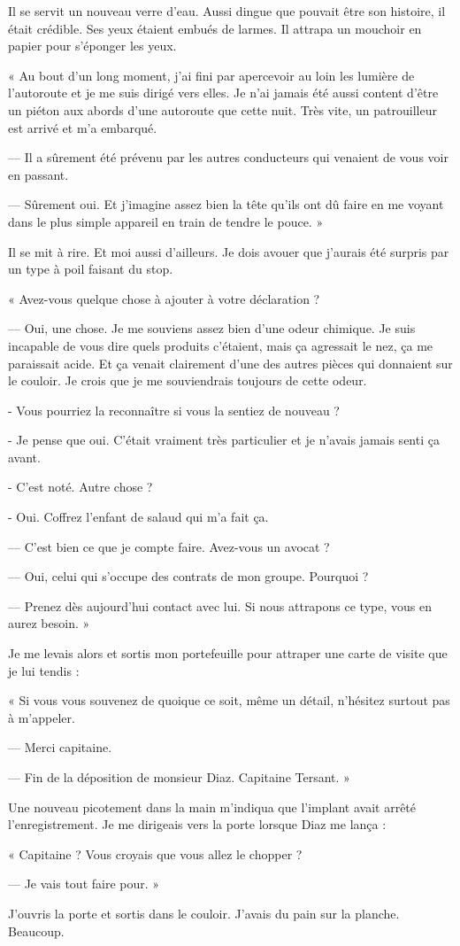 Il se servit un nouveau verre d'eau. Aussi dingue que pouvait être son histoire, il était crédible. Ses yeux étaient
embués de larmes. Il attrapa un mouchoir en papier pour s'éponger les yeux.

« Au bout d'un long moment, j'ai fini par apercevoir au loin les lumière de l'autoroute et je me suis dirigé vers elles.
Je n'ai jamais été aussi content d'être un piéton aux abords d'une autoroute que cette nuit. Très vite, un patrouilleur
est arrivé et m'a embarqué.

— Il a sûrement été prévenu par les autres conducteurs qui venaient de vous voir en passant.

— Sûrement oui. Et j'imagine assez bien la tête qu'ils ont dû faire en me voyant dans le plus simple appareil en train
de tendre le pouce. »

Il se mit à rire. Et moi aussi d'ailleurs. Je dois avouer que j'aurais été surpris par un type à poil faisant du stop.

« Avez-vous quelque chose à ajouter à votre déclaration ?

— Oui, une chose. Je me souviens assez bien d'une odeur chimique. Je suis incapable de vous dire quels produits
c'étaient, mais ça agressait le nez, ça me paraissait acide. Et ça venait clairement d'une des autres pièces qui
donnaient sur le couloir. Je crois que je me souviendrais toujours de cette odeur.

- Vous pourriez la reconnaître si vous la sentiez de nouveau ?

- Je pense que oui. C'était vraiment très particulier et je n'avais jamais senti ça avant.

- C'est noté. Autre chose ?

- Oui. Coffrez l'enfant de salaud qui m'a fait ça.

— C'est bien ce que je compte faire. Avez-vous un avocat ?

— Oui, celui qui s'occupe des contrats de mon groupe. Pourquoi ?

— Prenez dès aujourd'hui contact avec lui. Si nous attrapons ce type, vous en aurez besoin. »

Je me levais alors et sortis mon portefeuille pour attraper une carte de visite que je lui tendis :

« Si vous vous souvenez de quoique ce soit, même un détail, n'hésitez surtout pas à m'appeler.

— Merci capitaine.

— Fin de la déposition de monsieur Diaz. Capitaine Tersant. »

Une nouveau picotement dans la main m'indiqua que l'implant avait arrêté l'enregistrement. Je me dirigeais vers la
porte lorsque Diaz me lança :

« Capitaine ? Vous croyais que vous allez le chopper ?

— Je vais tout faire pour. »

J'ouvris la porte et sortis dans le couloir. J'avais du pain sur la planche. Beaucoup.